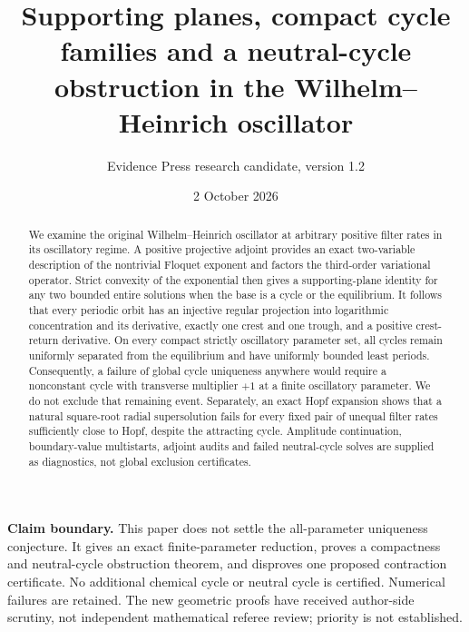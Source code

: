 \documentclass[11pt,a4paper]{article}
\title{Supporting planes, compact cycle families and a neutral-cycle obstruction in the Wilhelm--Heinrich oscillator}
\author{Evidence Press research candidate, version 1.2}
\date{2 October 2026}
\theoremstyle{remark}\newtheorem{remark}[theorem]{Remark}
\begin{document}
\maketitle
\noindent\textbf{Claim boundary.} This paper does not settle the all-parameter uniqueness conjecture. It gives an exact finite-parameter reduction, proves a compactness and neutral-cycle obstruction theorem, and disproves one proposed contraction certificate. No additional chemical cycle or neutral cycle is certified. Numerical failures are retained. The new geometric proofs have received author-side scrutiny, not independent mathematical referee review; priority is not established.
\begin{abstract}
We examine the original Wilhelm--Heinrich oscillator at arbitrary positive filter rates in its oscillatory regime. A positive projective adjoint provides an exact two-variable description of the nontrivial Floquet exponent and factors the third-order variational operator. Strict convexity of the exponential then gives a supporting-plane identity for any two bounded entire solutions when the base is a cycle or the equilibrium. It follows that every periodic orbit has an injective regular projection into logarithmic concentration and its derivative, exactly one crest and one trough, and a positive crest-return derivative. On every compact strictly oscillatory parameter set, all cycles remain uniformly separated from the equilibrium and have uniformly bounded least periods. Consequently, a failure of global cycle uniqueness anywhere would require a nonconstant cycle with transverse multiplier $+1$ at a finite oscillatory parameter. We do not exclude that remaining event. Separately, an exact Hopf expansion shows that a natural square-root radial supersolution fails for every fixed pair of unequal filter rates sufficiently close to Hopf, despite the attracting cycle. Amplitude continuation, boundary-value multistarts, adjoint audits and failed neutral-cycle solves are supplied as diagnostics, not global exclusion certificates.
\end{abstract}
\end{document}
